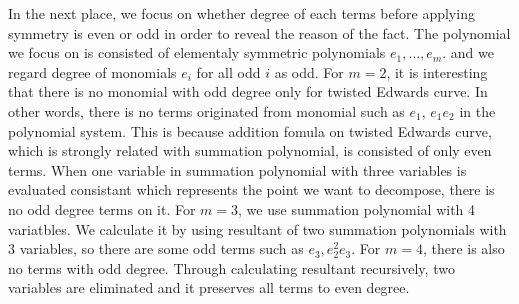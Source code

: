 In the next place, we focus on whether degree of each terms before 
applying symmetry is even or odd in order to reveal the reason of the fact.
The polynomial we focus on is consisted of elementaly symmetric polynomials 
$e_1, \dots ,e_m$. and we regard degree of monomials $e_i$ for all odd $i$ as odd.
For $m=2$, it is interesting that there is no monomial with odd degree 
only for twisted Edwards curve.
In other words, there is no terms originated from monomial
such as $e_1$, $e_1e_2$ in the polynomial system.
This is because addition fomula on twisted Edwards curve, 
which is strongly related with summation polynomial, 
is consisted of only even terms.
When one variable in summation polynomial with three variables
is evaluated consistant which represents the point we want to decompose, 
there is no odd degree terms on it.
For $m=3$, we use summation polynomial with 4 variatbles.
We calculate it by using resultant of two summation polynomials 
with 3 variables, so there are some odd terms such as $e_3, e_2^2e_3$.
For $m=4$, there is also no terms with odd degree.
Through calculating resultant recursively, two variables are eliminated
and it preserves all terms to even degree.

